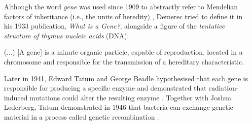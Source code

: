 Although the word \emph{gene} was used since 1909 to abstractly refer to Mendelian factors of inheritance (i.e., the units of heredity) \cite{gayon:2016uj}, Demerec tried to define it in his 1933 publication, \emph{What is a Gene?}, alongside a figure of the \emph{tentative structure of thymus nucleic acids} (DNA):

\begin{displayquote}
(...) [A gene] is a minute organic particle, capable of reproduction, located in a chromosome and responsible for the transmission of a hereditary characteristic.
\end{displayquote}

Later in 1941, Edward Tatum and George Beadle hypothesised that each gene is responsible for producing a specific enzyme and demonstrated that radiation-induced mutations could alter the resulting enzyme \cite{beadle:1941vs}. Together with Joshua Lederberg, Tatum demonstrated in 1946 that bacteria can exchange genetic material in a process called genetic recombination \cite{lederberg:1946wl}.



